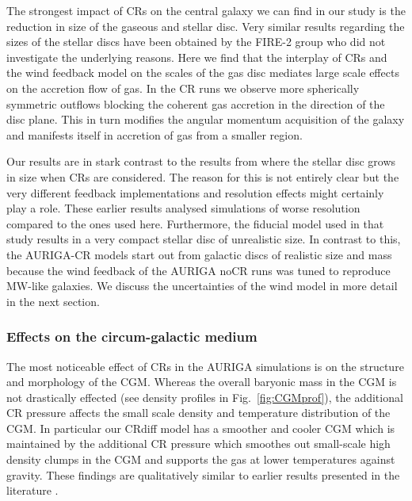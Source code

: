 \documentclass[useAMS,usenatbib]{mnras}
\begin{document}
The strongest impact of CRs on the central galaxy we can find in our study is the reduction in size of the gaseous and stellar disc. Very similar results regarding the sizes of the stellar discs have been obtained by the FIRE-2 group \citep[see e.g. their Fig.\ 12 in][]{Hopkins2019} who did not investigate the underlying reasons. Here we find that the interplay of CRs and the wind feedback model on the scales of the gas disc mediates large scale effects on the accretion flow of gas. In the CR runs we observe more spherically symmetric outflows blocking the coherent gas accretion in the direction of the disc plane. This in turn modifies the angular momentum acquisition of the galaxy and manifests itself in accretion of gas from a smaller region.

Our results are in stark contrast to the results from \citet{Salem2014b} where the stellar disc grows in size when CRs are considered. The reason for this is not entirely clear but the very different feedback implementations and resolution effects might certainly play a role. These earlier results analysed simulations of worse resolution compared to the ones used here. Furthermore, the fiducial model used in that study results in a very compact stellar disc of unrealistic size. In contrast to this, the AURIGA-CR models start out from galactic discs of realistic size and mass because the wind feedback of the AURIGA noCR runs was tuned to reproduce MW-like galaxies. We discuss the uncertainties of the wind model in more detail in the next section.

\subsubsection{Effects on the circum-galactic medium} 
The most noticeable effect of CRs in the AURIGA simulations is on the structure and morphology of the CGM. Whereas the overall baryonic mass in the CGM is not drastically effected (see density profiles in Fig.\ \ref{fig:CGMprof}), the additional CR pressure affects the small scale density and temperature distribution of the CGM. In particular our CRdiff model has a smoother and cooler CGM which is maintained by the additional CR pressure which smoothes out small-scale high density clumps in the CGM and supports the gas at lower temperatures against gravity. These findings are qualitatively similar to earlier results presented in the literature \citep[e.g.][]{Salem2014b,Salem2016,Chen2016,Butsky2018}.
\end{document}
